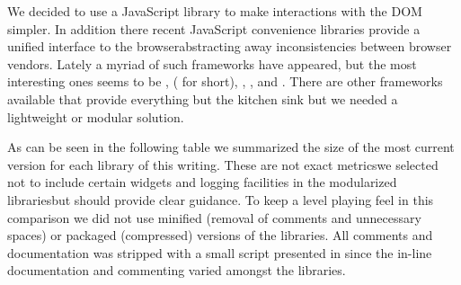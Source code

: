 We decided to use a JavaScript library to make interactions with the DOM
simpler. In addition there recent JavaScript convenience libraries provide a
unified interface to the browser\dash{}abstracting away inconsistencies
between browser vendors.
Lately a myriad of such frameworks have appeared, but the most
interesting ones seems to be
,
 ( for short),
,
, and
.%
There are other frameworks available that provide everything but the kitchen
sink but we needed a lightweight or modular solution.

As can be seen in the following table we summarized the size of the most
current version for each library of this writing. These are not exact
metrics\dash{}we selected not to include certain widgets and logging
facilities in the modularized libraries\dash{}but should provide clear
guidance. To keep a level playing feel in this comparison we did not use
minified (removal of comments and unnecessary spaces) or packaged (compressed)
versions of the libraries. All comments and documentation was stripped with a
small script presented in 
since the in-line documentation and commenting varied amongst the libraries.



